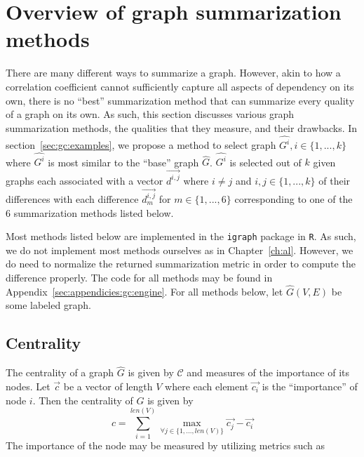 \section{Overview of graph summarization methods}
\label{sec:gc:methods}

There are many different ways to summarize a graph. However, akin to how a
correlation coefficient cannot sufficiently capture all aspects of dependency 
on its own, there is no ``best'' summarization method that can summarize 
every quality of a graph on its own. As such, this section discusses various 
graph summarization methods, the qualities that they measure, and their 
drawbacks. 
In section~\ref{sec:gc:examples}, we propose a method to select graph 
$\hat{G^i}, i \in \{1,...,k\}$ where $\hat{G^i}$ is most similar to the 
``base'' graph $\hat{G}$. $\hat{G^i}$ is selected out of $k$ given graphs each 
associated with a vector $\overrightarrow{d^{i,j}}$ where $i\neq j$ and $i,j 
\in \{1,...,k\}$ of their differences with each difference 
$\overrightarrow{d^{i,j}_m}$ for $m \in \{1,...,6\}$ corresponding to one of 
the 6 summarization methods listed below.

Most methods listed below are implemented in the \texttt{igraph} package in 
\texttt{R}. As such, we do not implement most methods ourselves as in 
Chapter~\ref{ch:al}. However, we do need to normalize the returned 
summarization metric in order to compute the difference properly. The code for 
all methods may be found in Appendix~\ref{sec:appendicies:gc:engine}.
For all methods below, let $\hat{G}(V,E)$ be some labeled graph.

\subsection{Centrality}

The centrality of a graph $\hat{G}$ is given by $\mathcal{C}$ and measures 
of the importance of its 
nodes. Let $\overrightarrow{c}$ be a vector of length $V$ where each element 
$\overrightarrow{c_i}$ is the ``importance'' of node $i$. Then the centrality 
of $\hat{G}$ is given by
$$c = \sum\limits^{len(V)}_{i=1} \max_{\forall j \in \{1,...,len(V)\}} 
\overrightarrow{c_j} - \overrightarrow{c_i}$$
The importance of the node may be measured by utilizing metrics such as 

